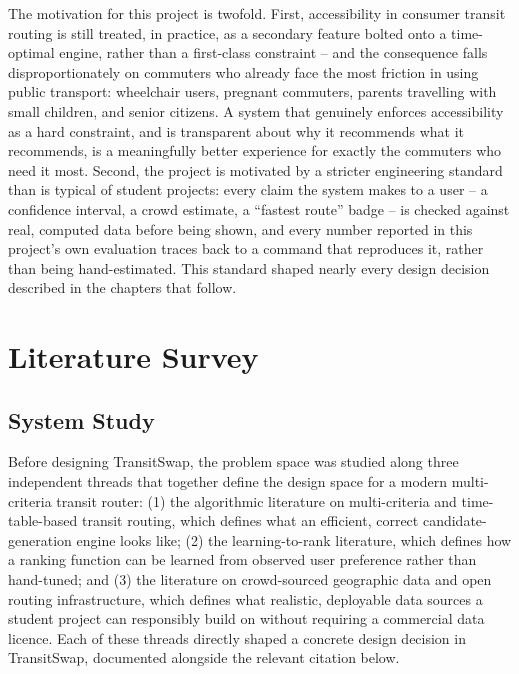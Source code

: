 \documentclass[12pt,a4paper]{report}
\begin{document}
The motivation for this project is twofold. First, accessibility in consumer transit routing is
still treated, in practice, as a secondary feature bolted onto a time-optimal engine, rather than a
first-class constraint -- and the consequence falls disproportionately on commuters who already
face the most friction in using public transport: wheelchair users, pregnant commuters, parents
travelling with small children, and senior citizens. A system that genuinely enforces accessibility
as a hard constraint, and is transparent about why it recommends what it recommends, is a
meaningfully better experience for exactly the commuters who need it most. Second, the project is
motivated by a stricter engineering standard than is typical of student projects: every claim the
system makes to a user -- a confidence interval, a crowd estimate, a ``fastest route'' badge -- is
checked against real, computed data before being shown, and every number reported in this project's
own evaluation traces back to a command that reproduces it, rather than being hand-estimated. This
standard shaped nearly every design decision described in the chapters that follow.

\chapter{Literature Survey}

\section{System Study}

Before designing TransitSwap, the problem space was studied along three independent threads that
together define the design space for a modern multi-criteria transit router: (1) the algorithmic
literature on multi-criteria and time-table-based transit routing, which defines what an
efficient, correct candidate-generation engine looks like; (2) the learning-to-rank literature,
which defines how a ranking function can be learned from observed user preference rather than
hand-tuned; and (3) the literature on crowd-sourced geographic data and open routing infrastructure,
which defines what realistic, deployable data sources a student project can responsibly build on
without requiring a commercial data licence. Each of these threads directly shaped a concrete design
decision in TransitSwap, documented alongside the relevant citation below.
\end{document}
